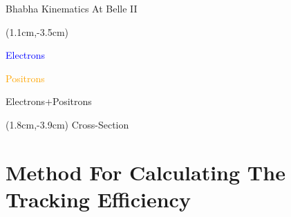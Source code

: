 \documentclass[8pt]{beamer}
\begin{document}
\begin{frame}{Bhabha Kinematics At Belle II}

	
	

\begin{textblock*}{4cm}(1.1cm,-3.5cm)
	\small{
	\textcolor{blue}{Electrons}
	
	\textcolor{orange}{Positrons}
		
	\textcolor{OliveGreen}{Electrons+Positrons}
}
\end{textblock*}


\begin{textblock*}{4cm}(1.8cm,-3.9cm)
	Cross-Section
\end{textblock*}






\end{frame}





\section{Method For Calculating The Tracking Efficiency}
\end{document}

